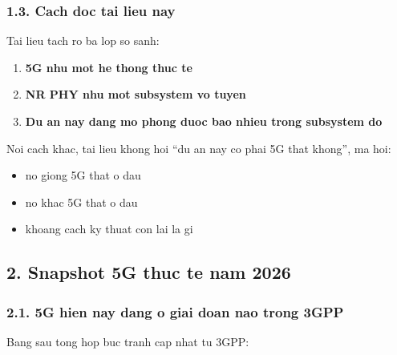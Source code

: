 \documentclass[
  vietnamese,
  a4paper,
  11pt]{article}
\providecommand{\tightlist}{%
  \setlength{\itemsep}{0pt}\setlength{\parskip}{0pt}}
\begin{document}
\subsubsection{1.3. Cach doc tai lieu nay}\label{cach-doc-tai-lieu-nay}

Tai lieu tach ro ba lop so sanh:

\begin{enumerate}
\def\labelenumi{\arabic{enumi}.}
\tightlist
\item
  \textbf{5G nhu mot he thong thuc te}
\item
  \textbf{NR PHY nhu mot subsystem vo tuyen}
\item
  \textbf{Du an nay dang mo phong duoc bao nhieu trong subsystem do}
\end{enumerate}

Noi cach khac, tai lieu khong hoi ``du an nay co phai 5G that khong'',
ma hoi:

\begin{itemize}
\tightlist
\item
  no giong 5G that o dau
\item
  no khac 5G that o dau
\item
  khoang cach ky thuat con lai la gi
\end{itemize}

\subsection{2. Snapshot 5G thuc te nam
2026}\label{snapshot-5g-thuc-te-nam-2026}

\subsubsection{2.1. 5G hien nay dang o giai doan nao trong
3GPP}\label{g-hien-nay-dang-o-giai-doan-nao-trong-3gpp}

Bang sau tong hop buc tranh cap nhat tu 3GPP:
\end{document}
